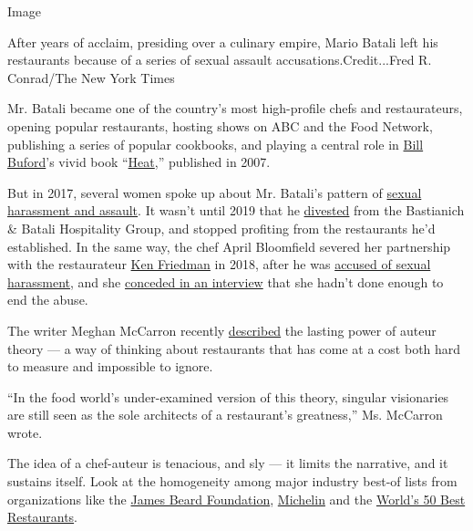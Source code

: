 Image

After years of acclaim, presiding over a culinary empire, Mario Batali
left his restaurants because of a series of sexual assault
accusations.Credit...Fred R. Conrad/The New York Times

Mr. Batali became one of the country's most high-profile chefs and
restaurateurs, opening popular restaurants, hosting shows on ABC and the
Food Network, publishing a series of popular cookbooks, and playing a
central role in
\href{https://www.nytimes.com/2020/07/21/dining/bill-buford-dirt-book-chicken-recipe.html}{Bill
Buford}'s vivid book
``\href{https://www.penguinrandomhouse.com/books/20949/heat-by-bill-buford/}{Heat},''
published in 2007.

But in 2017, several women spoke up about Mr. Batali's pattern of
\href{https://www.nytimes.com/2017/12/11/dining/mario-batali-sexual-misconduct.html}{sexual
harassment and assault}. It wasn't until 2019 that he
\href{https://www.nytimes.com/2019/03/06/dining/mario-batali-bastianich-restaurants.html}{divested}
from the Bastianich \& Batali Hospitality Group, and stopped profiting
from the restaurants he'd established. In the same way, the chef April
Bloomfield severed her partnership with the restaurateur
\href{https://www.nytimes.com/2017/12/12/dining/ken-friedman-sexual-harassment.html}{Ken
Friedman} in 2018, after he was
\href{https://www.nytimes.com/2017/12/12/dining/ken-friedman-sexual-harassment.html}{accused
of sexual harassment}, and she
\href{https://www.nytimes.com/2018/10/16/dining/april-bloomfield-spotted-pig-ken-friedman.html}{conceded
in an interview} that she hadn't done enough to end the abuse.

The writer Meghan McCarron recently
\href{https://www.eater.com/2019/11/7/20953914/jessica-koslow-gabriela-camara-restaurant-onda-opening}{described}
the lasting power of auteur theory --- a way of thinking about
restaurants that has come at a cost both hard to measure and impossible
to ignore.

``In the food world's under-examined version of this theory, singular
visionaries are still seen as the sole architects of a restaurant's
greatness,'' Ms. McCarron wrote.

The idea of a chef-auteur is tenacious, and sly --- it limits the
narrative, and it sustains itself. Look at the homogeneity among major
industry best-of lists from organizations like the
\href{https://www.jamesbeard.org/}{James Beard Foundation},
\href{https://guide.michelin.com/en/article/news-and-views/michelin-nordic-guide-2020-stars-and-awards-announced}{Michelin}
and the \href{https://www.theworlds50best.com/}{World's 50 Best
Restaurants}.

